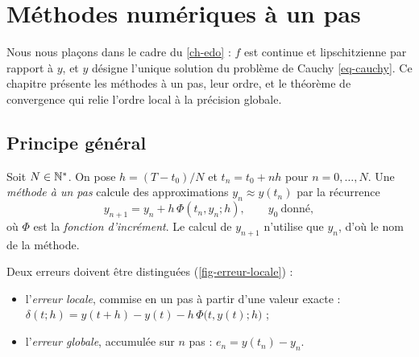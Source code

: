\chapter{Méthodes numériques à un pas}\label{ch-methodes}

Nous nous plaçons dans le cadre du \cref{ch-edo} : $f$ est continue et lipschitzienne par rapport à $y$, et $y$ désigne l'unique solution du problème de Cauchy \eqref{eq-cauchy}. Ce chapitre présente les méthodes à un pas, leur ordre, et le théorème de convergence qui relie l'ordre local à la précision globale.

\section{Principe général}\label{sec-principe}

Soit $N\in\mathbb{N}^\ast$. On pose $h=(T-t_0)/N$ et $t_n=t_0+nh$ pour $n=0,\dots,N$. Une \emph{méthode à un pas} calcule des approximations $y_n\approx y(t_n)$ par la récurrence
\begin{equation}\label{eq-onestep}
  y_{n+1}=y_n+h\,\Phi(t_n,y_n;h),\qquad y_0\ \text{donné},
\end{equation}
où $\Phi$ est la \emph{fonction d'incrément}. Le calcul de $y_{n+1}$ n'utilise que $y_n$, d'où le nom de la méthode.

Deux erreurs doivent être distinguées (\cref{fig-erreur-locale}) :
\begin{itemize}[itemsep=2pt]
  \item l'\emph{erreur locale}, commise en un pas à partir d'une valeur exacte : $\delta(t;h)=y(t+h)-y(t)-h\,\Phi\bigl(t,y(t);h\bigr)$ ;
  \item l'\emph{erreur globale}, accumulée sur $n$ pas : $e_n=y(t_n)-y_n$.
\end{itemize}

